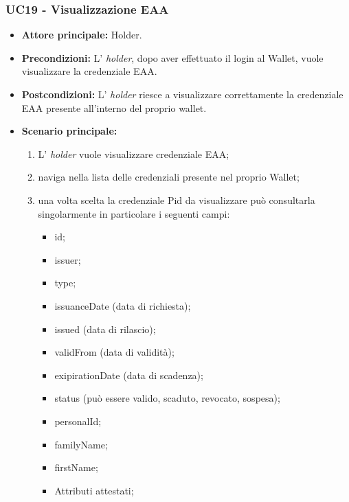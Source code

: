 \subsubsection{UC19 - Visualizzazione EAA}
\begin{itemize}
\item \textbf{Attore principale:} Holder.
\item \textbf{Precondizioni:} L’ \textit{holder}, dopo aver effettuato il login al Wallet,  vuole visualizzare la credenziale EAA.
\item \textbf{Postcondizioni:} L’ \textit{holder} riesce a visualizzare correttamente la credenziale EAA presente all'interno del proprio wallet.
\item \textbf{Scenario principale:} 
    \begin{enumerate}
        \item L' \textit{holder} vuole visualizzare credenziale EAA; 
        \item naviga nella lista delle credenziali presente nel proprio Wallet;
        \item una volta scelta la credenziale Pid da visualizzare può consultarla singolarmente in particolare i seguenti campi:
        \begin{itemize}
            \item id;
            \item issuer;
            \item type;
            \item issuanceDate (data di richiesta);
            \item issued (data di rilascio);
            \item validFrom (data di validità);
            \item exipirationDate (data di scadenza);
            \item status (può essere valido, scaduto, revocato, sospesa);
            \item personalId;
            \item familyName;
            \item firstName;
            \item Attributi attestati;
        \end{itemize}
    \end{enumerate}
\end{itemize}


